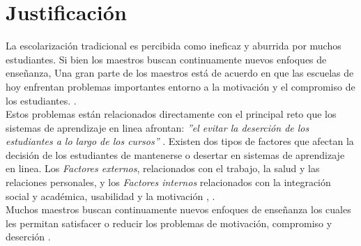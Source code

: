\clearpage
\section{Justificación}
\label{sec:justificacion}


La escolarización tradicional es percibida como ineficaz y aburrida por muchos estudiantes. Si bien los maestros buscan continuamente nuevos enfoques de enseñanza, Una gran parte de los maestros está de acuerdo en que las escuelas de hoy enfrentan problemas importantes entorno a la motivación y el compromiso de los estudiantes. \cite{objetivo1}.\\

\noindent Estos problemas están relacionados directamente con el principal reto que los sistemas de aprendizaje en linea afrontan: {\it''el evitar la deserción de los estudiantes a lo largo de los cursos''} \cite{objetivo1}. Existen dos tipos de factores que afectan la decisión de los estudiantes de mantenerse o desertar en sistemas de aprendizaje en linea. Los {\it Factores externos}, relacionados con el trabajo, la salud y las relaciones personales, y los {\it Factores internos} relacionados con la integración social y académica, usabilidad y la motivación \cite{problematica1}, \cite{dropoutOnline}.\\
    
    
\noindent Muchos maestros buscan continuamente nuevos enfoques de enseñanza los cuales les permitan satisfacer o reducir los problemas de motivación, compromiso y deserción \cite{objetivo1}. \nolinebreak

